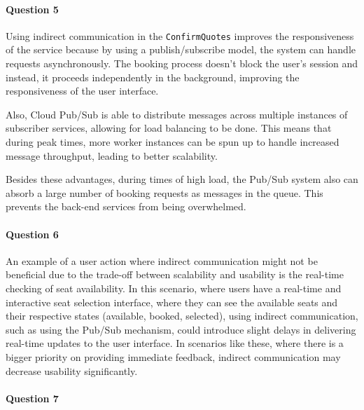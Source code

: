 \documentclass{ds-report}
\begin{document}
    \paragraph{Question 5} 

Using indirect communication in the \texttt{ConfirmQuotes} improves the responsiveness of the service because by using a publish/subscribe model, the system can handle requests asynchronously. The booking process doesn't block the user's session and instead, it proceeds independently in the background, improving the responsiveness of the user interface. 

Also, Cloud Pub/Sub is able to distribute messages across multiple instances of subscriber services, allowing for load balancing to be done. This means that during peak times, more worker instances can be spun up to handle increased message throughput, leading to better scalability.

Besides these advantages, during times of high load, the Pub/Sub system also can absorb a large number of booking requests as messages in the queue. This prevents the back-end services from being overwhelmed.

    \paragraph{Question 6} 
An example of a user action where indirect communication might not be beneficial due to the trade-off between scalability and usability is the real-time checking of seat availability. In this scenario, where users have a real-time and interactive seat selection interface, where they can see the available seats and their respective states (available, booked, selected), using indirect communication, such as using the Pub/Sub mechanism, could introduce slight delays in delivering real-time updates to the user interface. In scenarios like these, where there is a bigger priority on providing immediate feedback, indirect communication may decrease usability significantly.


    \paragraph{Question 7} 
\end{document}
